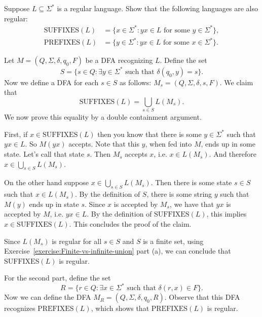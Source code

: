 \begin{flex}
\begin{exercise} \label{exercise:Regularity-of-suffixes-and-prefixes}
Suppose $L \subseteq \Sigma^*$ is a regular language. 
Show that the following languages are also regular:
\begin{align*}
\text{SUFFIXES}(L) & = \{x \in \Sigma^* : \text{$yx \in L$ for some $y \in \Sigma^*$}\},  \\
\text{PREFIXES}(L) & = \{y \in \Sigma^* : \text{$yx \in L$ for some $x \in  \Sigma^*$}\}.
\end{align*}
\end{exercise}

\begin{solution}
Let $M = (Q, \Sigma, \delta, q_0, F)$ be a DFA recognizing $L$. Define the set 
\[
    S = \{s \in Q: \exists y \in \Sigma^* \text{ such that } \delta(q_0,y) = s\}.
\]
Now we define a DFA for each $s \in S$ as follows: $M_s = (Q, \Sigma, \delta, s, F)$. We claim that 
\[
\text{SUFFIXES}(L) = \bigcup_{s \in S} L(M_s).
\]
We now prove this equality by a double containment argument.

First, if $x \in \text{SUFFIXES}(L)$ then you know that there is some $y \in \Sigma^*$ such that $yx \in L$. So $M(yx)$ accepts. Note that this $y$, when fed into $M$, ends up in some state. Let's call that state $s$. Then $M_s$ accepts $x$, i.e. $x \in L(M_s)$. And therefore $x \in \bigcup_{s \in S} L(M_s)$.

On the other hand suppose  $x \in \bigcup_{s \in S} L(M_s)$. Then there is some state $s \in S$ such that $x \in L(M_s)$. By the definition of $S$, there is some string $y$ such that $M(y)$ ends up in state $s$. Since $x$ is accepted by $M_s$, we have that $yx$ is accepted by $M$, i.e. $yx \in L$. By the definition of $\text{SUFFIXES}(L)$, this implies $x \in \text{SUFFIXES}(L)$. This concludes the proof of the claim.

Since $L(M_s)$ is regular for all $s \in S$ and $S$ is a finite set, using Exercise~\ref{exercise:Finite-vs-infinite-union} part (a), we can conclude that $\text{SUFFIXES}(L)$ is regular.

For the second part, define the set
\[
    R = \{r \in Q : \exists x \in \Sigma^* \text{ such that } \delta(r, x) \in F\}.
\]
Now we can define the DFA $M_R = (Q, \Sigma, \delta, q_0, R)$. Observe that this DFA recognizes $\text{PREFIXES}(L)$, which shows that $\text{PREFIXES}(L)$ is regular.
\end{solution}
\end{flex}


